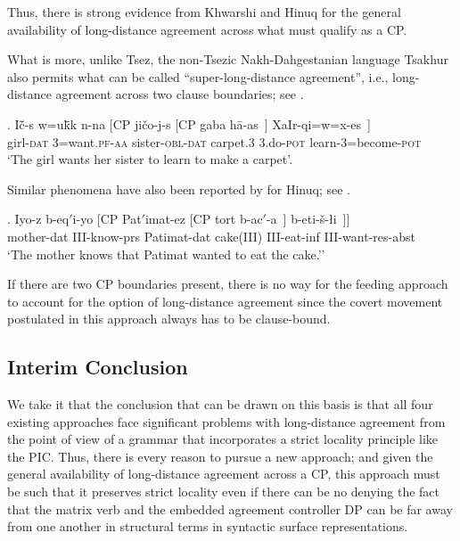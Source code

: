 \documentclass[output=paper
,modfonts
,nonflat]{langsci/langscibook}
\begin{document}
Thus, there is strong evidence from Khwarshi and Hinuq for the general
availability of long-distance agreement across what must qualify as a
CP.

What is more, unlike Tsez, the non-Tsezic Nakh-Dahgestanian language
Tsakhur  also permits what can be called
``super-long-distance agreement'', i.e., long-distance agreement 
across two clause boundaries; see \cite{Kibrik:99}.

	\exig. \label{tsa1}I\v{c}\={\textsci}-s w=u\={k}\={\textsci}k\textbari
        n-na [CP ji\v{c}o-j-s [CP gaba  h\={a}\textglotstop-as~] XaIr-qi=w=x-es~] \\
		girl-\textsc{dat} {3}=want.\textsc{pf-{aa}} {}
                sister-\textsc{obl-dat} {} {carpet.3} 3.do-\textsc{pot} learn-{3}=become-\textsc{pot} \\
`The girl wants her sister to learn to make a carpet'.  

Similar phenomena have also been reported by \cite{Forker:11} for
Hinuq; see \Next.

\exig. \label{tsa2}Iyo-z b-eq$'$i-yo [CP Pat$'$imat-ez [CP tort
    b-ac$'$-a~] b-eti-\v{s}-\l i~]]\\
mother-{\sc dat} III-know-{\sc prs} {} Patimat-{\sc dat} {} cake(III)
III-eat-{\sc inf} III-want-{\sc res}-{\sc abst}\\
`The mother knows that Patimat wanted to eat the cake.''

If there are two CP boundaries present, there is no way for the feeding approach
to account for the option of long-distance agreement since the covert
movement postulated in this approach always has to be
clause-bound.

\subsection{Interim Conclusion}

We take it that the conclusion that can be drawn on this basis is that
all four existing approaches face significant problems with
long-distance agreement from the point of view of a grammar that
incorporates a strict locality principle like the PIC. Thus, there is
every reason to pursue a  new approach; and given the general
availability of long-distance agreement across a CP, this approach
must be such that it preserves strict locality even if there can be no
denying the fact that the matrix verb and the embedded agreement
controller DP can be far away from one another in structural terms in
syntactic surface representations. 
\end{document}
